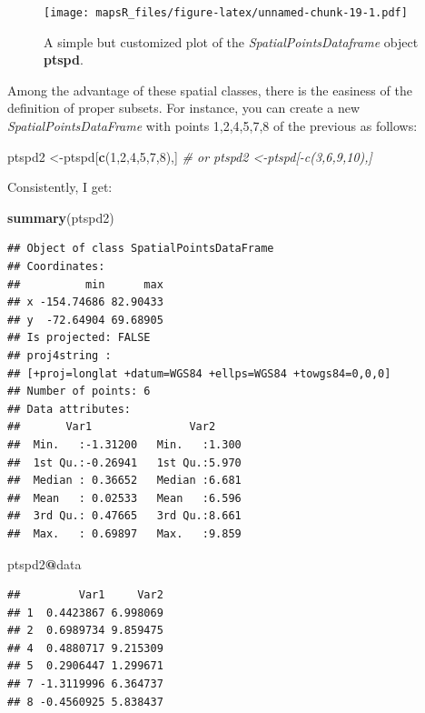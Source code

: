 \documentclass[]{report}
\newenvironment{Shaded}{\begin{snugshade}}{\end{snugshade}}
\newcommand{\CommentTok}[1]{\textcolor[rgb]{0.56,0.35,0.01}{\textit{#1}}}
\newcommand{\DecValTok}[1]{\textcolor[rgb]{0.00,0.00,0.81}{#1}}
\newcommand{\KeywordTok}[1]{\textcolor[rgb]{0.13,0.29,0.53}{\textbf{#1}}}
\newcommand{\NormalTok}[1]{#1}
\newcommand{\OperatorTok}[1]{\textcolor[rgb]{0.81,0.36,0.00}{\textbf{#1}}}
\begin{document}
\begin{figure}
\centering
\texttt{[image: mapsR\_files/figure-latex/unnamed-chunk-19-1.pdf]}
\caption{A simple but customized plot of the
\emph{SpatialPointsDataframe} object \textbf{ptspd}.}
\end{figure}

Among the advantage of these spatial classes, there is the easiness of
the definition of proper subsets. For instance, you can create a new
\emph{SpatialPointsDataFrame} with points 1,2,4,5,7,8 of the previous as
follows:

\begin{Shaded}
\begin{Highlighting}[]
\NormalTok{ptspd2 <-ptspd[}\KeywordTok{c}\NormalTok{(}\DecValTok{1}\NormalTok{,}\DecValTok{2}\NormalTok{,}\DecValTok{4}\NormalTok{,}\DecValTok{5}\NormalTok{,}\DecValTok{7}\NormalTok{,}\DecValTok{8}\NormalTok{),]}
\CommentTok{# or ptspd2 <-ptspd[-c(3,6,9,10),]}
\end{Highlighting}
\end{Shaded}

Consistently, I get:

\begin{Shaded}
\begin{Highlighting}[]
\KeywordTok{summary}\NormalTok{(ptspd2)}
\end{Highlighting}
\end{Shaded}

\begin{verbatim}
## Object of class SpatialPointsDataFrame
## Coordinates:
##          min      max
## x -154.74686 82.90433
## y  -72.64904 69.68905
## Is projected: FALSE 
## proj4string :
## [+proj=longlat +datum=WGS84 +ellps=WGS84 +towgs84=0,0,0]
## Number of points: 6
## Data attributes:
##       Var1               Var2      
##  Min.   :-1.31200   Min.   :1.300  
##  1st Qu.:-0.26941   1st Qu.:5.970  
##  Median : 0.36652   Median :6.681  
##  Mean   : 0.02533   Mean   :6.596  
##  3rd Qu.: 0.47665   3rd Qu.:8.661  
##  Max.   : 0.69897   Max.   :9.859
\end{verbatim}

\begin{Shaded}
\begin{Highlighting}[]
\NormalTok{ptspd2}\OperatorTok{@}\NormalTok{data}
\end{Highlighting}
\end{Shaded}

\begin{verbatim}
##         Var1     Var2
## 1  0.4423867 6.998069
## 2  0.6989734 9.859475
## 4  0.4880717 9.215309
## 5  0.2906447 1.299671
## 7 -1.3119996 6.364737
## 8 -0.4560925 5.838437
\end{verbatim}
\end{document}
